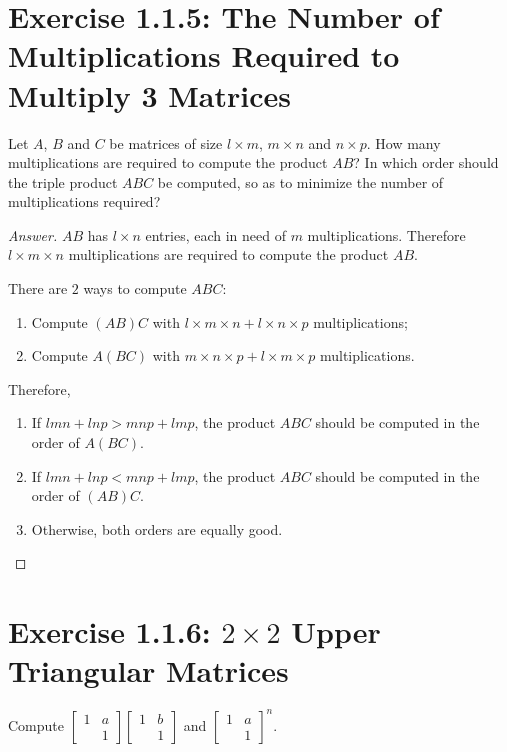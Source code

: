 \documentclass{amsbook}
\theoremstyle{definition}
\theoremstyle{remark}
\numberwithin{section}{chapter}
\numberwithin{equation}{chapter}
\begin{document}
\section{Exercise 1.1.5: The Number of Multiplications Required to Multiply 3 Matrices}

Let $A$, $B$ and $C$ be matrices of size $l\times m$, $m\times n$ and $n\times p$. How many multiplications are required to compute the product $AB$? In which order should the triple product $ABC$ be computed, so as to minimize the number of multiplications required?

\begin{proof}[Answer]
$AB$ has $l\times n$ entries, each in need of $m$ multiplications. Therefore $l\times m\times n$ multiplications are required to compute the product $AB$.

There are $2$ ways to compute $ABC$:

\begin{enumerate}
\item Compute $(AB)C$ with $l\times m\times n + l\times n\times p$ multiplications;
\item Compute $A(BC)$ with $m\times n\times p + l\times m\times p$ multiplications.
\end{enumerate}

Therefore,

\begin{enumerate}
\item If $lmn+lnp>mnp+lmp$, the product $ABC$ should be computed in the order of $A(BC)$.
\item If $lmn+lnp<mnp+lmp$, the product $ABC$ should be computed in the order of $(AB)C$.
\item Otherwise, both orders are equally good.
\end{enumerate}
\end{proof}

\section{Exercise 1.1.6: $2\times2$ Upper Triangular Matrices}

Compute $\begin{bmatrix}
1 &a\\
   &1\end{bmatrix}\begin{bmatrix}
1 &b\\
   &1\end{bmatrix}$ and $\begin{bmatrix}
1 &a\\
   &1\end{bmatrix}^n$.
\end{document}
